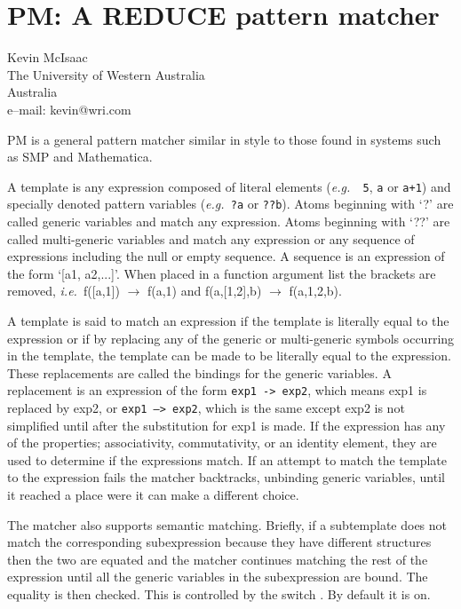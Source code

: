 \chapter{PM: A REDUCE pattern matcher}
\label{PM}

{\footnotesize
\begin{center}
Kevin McIsaac \\
The University of Western Australia \\
Australia\\[0.05in]
e--mail: kevin@wri.com
\end{center}
}

PM is a general pattern matcher similar in style to those found in systems
such as SMP and Mathematica.

A template is any expression composed of literal elements ({\em e.g.\ }{\tt
5}, {\tt a} or {\tt a+1}) and specially denoted pattern variables
({\em e.g.\ }{\tt ?a} or {\tt ??b}).  Atoms
beginning with `?' are called generic variables and match any expression.
Atoms beginning with `??' are called multi-generic variables and match any
expression or any sequence of expressions including the null or empty
sequence.  A sequence is an expression of the form `[a1, a2,...]'.  When
placed in a function argument list the brackets are removed, {\em
i.e.\ }f([a,1]) $\rightarrow$ f(a,1) and f(a,[1,2],b) $\rightarrow$ f(a,1,2,b).

A template is said to match an  expression  if the template is literally
equal to the expression or if by replacing any of the generic or
multi-generic symbols occurring in the template, the template can be made
to be literally equal to the expression.  These replacements are called the
bindings for the generic variables.  A replacement is an expression of the
form {\tt exp1 -> exp2}, which means exp1 is replaced by exp2, or
{\tt exp1 --> exp2}, which is the same except exp2 is not simplified
until after the 
substitution for exp1 is made.  If the expression has any of the
properties; associativity, commutativity, or an identity element, they are
used to determine if the expressions match.  If an attempt to match the
template to the expression fails the matcher backtracks, unbinding generic
variables, until it reached a place were it can make a different choice.

The matcher also supports semantic matching.  Briefly, if a subtemplate
does not match the corresponding subexpression because they have different
structures then the two are equated and the matcher continues matching the
rest of the expression until all the generic variables in the subexpression
are bound.  The equality is then checked.  This is controlled by the switch
.  By default it is on.

